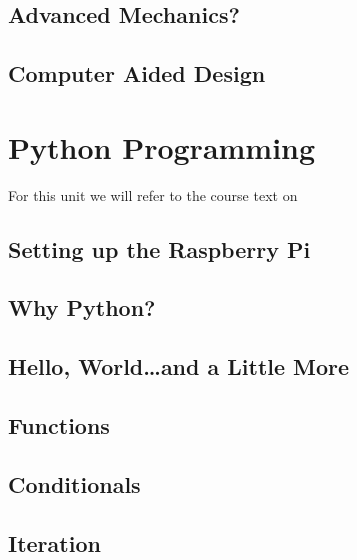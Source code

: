 \documentclass[
]{book}
\begin{document}
\hypertarget{advanced-mechanics}{%
\section{Advanced Mechanics?}\label{advanced-mechanics}}

\hypertarget{computer-aided-design}{%
\section{Computer Aided Design}\label{computer-aided-design}}

\hypertarget{python-programming}{%
\chapter{Python Programming}\label{python-programming}}

For this unit we will refer to the course text on

\hypertarget{setting-up-the-raspberry-pi}{%
\section{Setting up the Raspberry Pi}\label{setting-up-the-raspberry-pi}}

\hypertarget{why-python}{%
\section{Why Python?}\label{why-python}}

\hypertarget{hello-worldand-a-little-more}{%
\section{Hello, World\ldots and a Little More}\label{hello-worldand-a-little-more}}

\hypertarget{functions}{%
\section{Functions}\label{functions}}

\hypertarget{conditionals}{%
\section{Conditionals}\label{conditionals}}

\hypertarget{iteration}{%
\section{Iteration}\label{iteration}}
\end{document}
